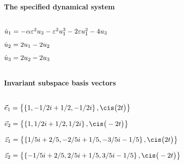
\(\)
\paragraph{The specified dynamical system}
\(
\)\par

\(\dot u_{1}=-\alpha  \varepsilon^{2} u\sb3-\varepsilon^{2} u\sb1^{3}-2 \varepsilon u\sb1^{2}-4
 u\sb3
\)\par

\(\dot u_{2}=2 u\sb1-2 u\sb2
\)\par

\(\dot u_{3}=2 u\sb2-2 u\sb3
\)\par

\(\)
\paragraph{Invariant subspace basis vectors}
\(
\)\par

\(\vec e_{1}=\left\{
\left\{
1 , -1/2 i+1/2 , -1/2 i
\right\} , \cis\big(2 t\big)
\right\}
\)\par

\(\vec e_{2}=\left\{
\left\{
1 , 1/2 i+1/2 , 1/2 i
\right\} , \cis\big(-2 t\big)
\right\}
\)\par

\(\vec z_{1}=\left\{
\left\{
1/5 i+2/5 , -2/5 i+1/5 , -3/5 i-1/5
\right\} , \cis\big(2 t\big)
\right\}
\)\par

\(\vec z_{2}=\left\{
\left\{
-1/5 i+2/5 , 2/5 i+1/5 , 3/5 i-1/5
\right\} , \cis\big(-2 t\big)
\right\}
\)\par
